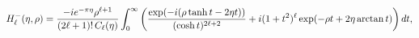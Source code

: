 \[\mathop{{H^{-}_{\ell}}\/}\nolimits\!\left(\eta,\rho\right)=\frac{-ie^{-\pi\eta%
}\rho^{\ell+1}}{(2\ell+1)!\mathop{C_{\ell}\/}\nolimits\!\left(\eta\right)}\int%
_{0}^{\infty}\left(\frac{\mathop{\exp\/}\nolimits\!\left(-i(\rho\mathop{\tanh%
\/}\nolimits t-2\eta t)\right)}{(\mathop{\cosh\/}\nolimits t)^{2\ell+2}}+i(1+t%
^{2})^{\ell}\mathop{\exp\/}\nolimits\!\left(-\rho t+2\eta\mathop{\mathrm{%
arctan}\/}\nolimits t\right)\right)dt,\]